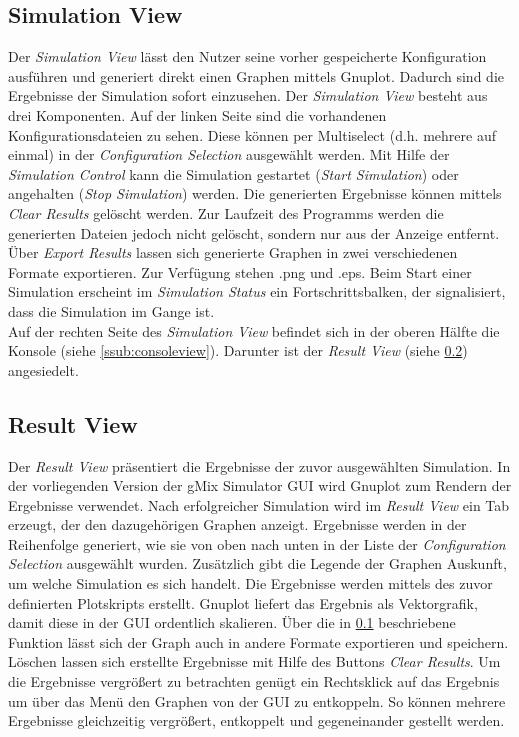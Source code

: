\documentclass[a4paper, 11pt]{article} %
\begin{document}
\subsection{Simulation View} %
\label{ssub:simulationview}
Der \emph{Simulation View} lässt den Nutzer seine vorher gespeicherte Konfiguration ausführen und generiert direkt einen Graphen mittels Gnuplot. Dadurch sind die Ergebnisse der Simulation sofort einzusehen. Der \emph{Simulation View} besteht aus drei Komponenten. Auf der linken Seite sind die vorhandenen Konfigurationsdateien zu sehen. Diese können per Multiselect (d.h. mehrere auf einmal) in der \emph{Configuration Selection} ausgewählt werden. Mit Hilfe der \emph{Simulation Control} kann die Simulation gestartet (\emph{Start Simulation}) oder angehalten (\emph{Stop Simulation}) werden. Die generierten Ergebnisse können mittels \emph{Clear Results} gelöscht werden. Zur Laufzeit des Programms werden die generierten Dateien jedoch nicht gelöscht, sondern nur aus der Anzeige entfernt. Über \emph{Export Results} lassen sich generierte Graphen in zwei verschiedenen Formate exportieren. Zur Verfügung stehen .png und .eps. Beim Start einer Simulation erscheint im \emph{Simulation Status} ein Fortschrittsbalken, der signalisiert, dass die Simulation im Gange ist. \\

Auf der rechten Seite des \emph{Simulation View} befindet sich in der oberen Hälfte die Konsole (siehe \ref{ssub:consoleview}). Darunter ist der \emph{Result View} (siehe \ref{ssub:resultview}) angesiedelt.

\subsection{Result View} %
\label{ssub:resultview}
Der \emph{Result View} präsentiert die Ergebnisse der zuvor ausgewählten Simulation. In der vorliegenden Version der gMix Simulator GUI wird Gnuplot zum Rendern der Ergebnisse verwendet. Nach erfolgreicher Simulation wird im \emph{Result View} ein Tab erzeugt, der den dazugehörigen Graphen anzeigt. Ergebnisse werden in der Reihenfolge generiert, wie sie von oben nach unten in der Liste der \emph{Configuration Selection} ausgewählt wurden. Zusätzlich gibt die Legende der Graphen Auskunft, um welche Simulation es sich handelt. Die Ergebnisse werden mittels des zuvor definierten Plotskripts erstellt. Gnuplot liefert das Ergebnis als Vektorgrafik, damit diese in der GUI ordentlich skalieren. Über die in \ref{ssub:simulationview} beschriebene Funktion lässt sich der Graph auch in andere Formate exportieren und speichern. Löschen lassen sich erstellte Ergebnisse mit Hilfe des Buttons \emph{Clear Results}. Um die Ergebnisse vergrößert zu betrachten genügt ein Rechtsklick auf das Ergebnis um über das Menü den Graphen von der GUI zu entkoppeln. So können mehrere Ergebnisse gleichzeitig vergrößert, entkoppelt und gegeneinander gestellt werden. 
\end{document}
